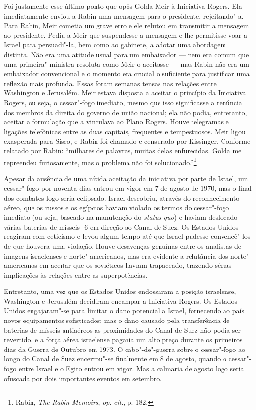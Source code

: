 Foi justamente esse último ponto que opôs Golda Meir à Iniciativa
Rogers. Ela imediatamente enviou a Rabin uma mensagem para o presidente,
rejeitando"-a. Para Rabin, Meir cometia um grave erro e ele relutou em
transmitir a mensagem ao presidente. Pediu a Meir que suspendesse a
mensagem e lhe permitisse voar a Israel para persuadi"-la, bem como ao gabinete,
a adotar uma abordagem distinta. Não era uma atitude usual para um
embaixador --- nem era comum que uma primeira"-ministra resoluta como Meir
o aceitasse --- mas Rabin não era um embaixador convencional e o momento
era crucial o suficiente para justificar uma reflexão mais profunda.
Essas foram semanas tensas nas relações entre Washington e Jerusalém.
Meir estava disposta a aceitar o princípio da Iniciativa Rogers, ou
seja, o cessar"-fogo imediato, mesmo que isso significasse a renúncia dos
membros da direita do governo de união nacional; ela não podia,
entretanto, aceitar a formulação que a vinculava ao Plano Rogers. Houve
telegramas e ligações telefônicas entre as duas capitais, frequentes e
tempestuosos. Meir ligou exasperada para Sisco, e Rabin foi chamado e
censurado por Kissinger. Conforme relatado por Rabin: ``milhares de
palavras, muitas delas enfurecidas. Golda me repreendeu furiosamente,
mas o problema não foi solucionado.''\footnote{Rabin, \emph{The Rabin Memoirs}, \emph{op}. \emph{cit}., p. 182.}

Apesar da ausência de uma nítida aceitação da iniciativa por parte de
Israel, um cessar"-fogo por noventa dias entrou em vigor em 7 de agosto
de 1970, mas o final dos combates logo seria eclipsado. Israel descobriu,
através do reconhecimento aéreo, que os russos e os egípcios haviam
violado os termos do cessar"-fogo imediato (ou seja, baseado na
manutenção do \emph{status quo}) e haviam deslocado várias baterias de
mísseis -6 em direção ao Canal de Suez. Os Estados Unidos reagiram
com ceticismo e levou algum tempo até que Israel pudesse convencê"-los de
que houvera uma violação. Houve desavenças genuínas entre os analistas
de imagens israelenses e norte"-americanos, mas era evidente a relutância
dos norte"-americanos em aceitar que os soviéticos haviam trapaceado,
trazendo sérias implicações às relações entre as superpotências.

Entretanto, uma vez que os Estados Unidos endossaram a posição
israelense, Washington e Jerusalém decidiram encampar a Iniciativa
Rogers. Os Estados Unidos engajaram"-se para limitar o dano potencial a
Israel, fornecendo ao país novos equipamentos sofisticados; mas o dano
causado pela transferência de baterias de mísseis antiaéreos às
proximidades do Canal de Suez não podia ser revertido, e a força aérea
israelense pagaria um alto preço durante os primeiros dias da Guerra de
Outubro em 1973. O cabo"-de"-guerra sobre o cessar"-fogo ao longo do Canal
de Suez encerrou"-se finalmente em 8 de agosto, quando o cessar"-fogo
entre Israel e o Egito entrou em vigor. Mas a calmaria de agosto logo
seria ofuscada por dois importantes eventos em setembro.

